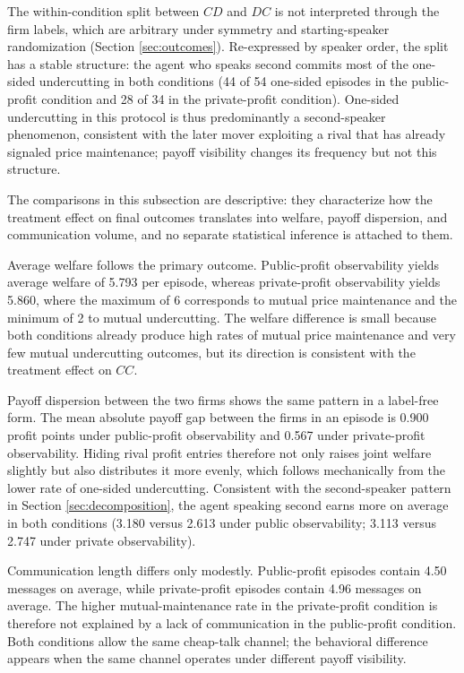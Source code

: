 \documentclass[11pt,a4paper]{article}
\makeatletter
\renewcommand\subsection{\@startsection{subsection}{2}{\z@}{9pt}{6pt}{\normalfont\fontsize{12pt}{14pt}\bfseries}}
\makeatother
\begin{document}
The within-condition split between $CD$ and $DC$ is not interpreted through the firm labels, which are arbitrary under symmetry and starting-speaker randomization (Section \ref{sec:outcomes}). Re-expressed by speaker order, the split has a stable structure: the agent who speaks second commits most of the one-sided undercutting in both conditions (44 of 54 one-sided episodes in the public-profit condition and 28 of 34 in the private-profit condition). One-sided undercutting in this protocol is thus predominantly a second-speaker phenomenon, consistent with the later mover exploiting a rival that has already signaled price maintenance; payoff visibility changes its frequency but not this structure.

\subsection{Welfare, Payoff Balance, and Communication}

The comparisons in this subsection are descriptive: they characterize how the treatment effect on final outcomes translates into welfare, payoff dispersion, and communication volume, and no separate statistical inference is attached to them.

Average welfare follows the primary outcome. Public-profit observability yields average welfare of 5.793 per episode, whereas private-profit observability yields 5.860, where the maximum of 6 corresponds to mutual price maintenance and the minimum of 2 to mutual undercutting. The welfare difference is small because both conditions already produce high rates of mutual price maintenance and very few mutual undercutting outcomes, but its direction is consistent with the treatment effect on $CC$.

Payoff dispersion between the two firms shows the same pattern in a label-free form. The mean absolute payoff gap between the firms in an episode is 0.900 profit points under public-profit observability and 0.567 under private-profit observability. Hiding rival profit entries therefore not only raises joint welfare slightly but also distributes it more evenly, which follows mechanically from the lower rate of one-sided undercutting. Consistent with the second-speaker pattern in Section \ref{sec:decomposition}, the agent speaking second earns more on average in both conditions (3.180 versus 2.613 under public observability; 3.113 versus 2.747 under private observability).

Communication length differs only modestly. Public-profit episodes contain 4.50 messages on average, while private-profit episodes contain 4.96 messages on average. The higher mutual-maintenance rate in the private-profit condition is therefore not explained by a lack of communication in the public-profit condition. Both conditions allow the same cheap-talk channel; the behavioral difference appears when the same channel operates under different payoff visibility.
\end{document}
